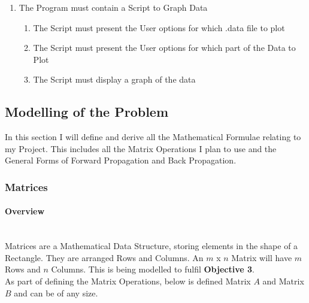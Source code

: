 \begin{flushleft}
\begin{enumerate}
                \item The Program must contain a Script to Graph Data
                \begin{enumerate}
                    \item The Script must present the User options for which .data file to plot
                    \item The Script must present the User options for which part of the Data to Plot
                    \item The Script must display a graph of the data
                \end{enumerate}
            \end{enumerate}
        \subsection{Modelling of the Problem}
            \large
            In this section I will define and derive all the Mathematical Formulae relating to my Project. This includes all the Matrix Operations 
            I plan to use and the General Forms of Forward Propagation and Back Propagation. \\

            \subsubsection{Matrices}
                \paragraph{Overview} \mbox{} \\
                Matrices are a Mathematical Data Structure, storing elements in the shape of a Rectangle. They are arranged Rows and Columns.
                An $m$ x $n$ Matrix will have $m$ Rows and $n$ Columns. This is being modelled to fulfil \textbf{Objective 3}.\\
                \vspace{0.2cm}
                As part of defining the Matrix Operations, below is defined Matrix $A$ and Matrix $B$ and can be of any size. \\
                \vspace{0.5cm}


\end{flushleft}

